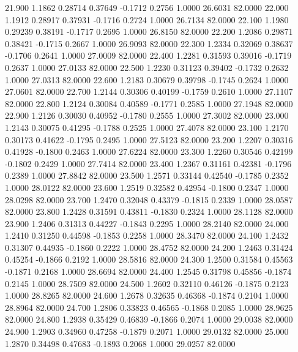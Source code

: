   21.900   1.1862   0.28714   0.37649  -0.1712   0.2756   1.0000  26.6031  82.0000
  22.000   1.1912   0.28917   0.37931  -0.1716   0.2724   1.0000  26.7134  82.0000
  22.100   1.1980   0.29239   0.38191  -0.1717   0.2695   1.0000  26.8150  82.0000
  22.200   1.2086   0.29871   0.38421  -0.1715   0.2667   1.0000  26.9093  82.0000
  22.300   1.2334   0.32069   0.38637  -0.1706   0.2641   1.0000  27.0009  82.0000
  22.400   1.2281   0.31593   0.39016  -0.1719   0.2637   1.0000  27.0133  82.0000
  22.500   1.2230   0.31123   0.39402  -0.1732   0.2632   1.0000  27.0313  82.0000
  22.600   1.2183   0.30679   0.39798  -0.1745   0.2624   1.0000  27.0601  82.0000
  22.700   1.2144   0.30306   0.40199  -0.1759   0.2610   1.0000  27.1107  82.0000
  22.800   1.2124   0.30084   0.40589  -0.1771   0.2585   1.0000  27.1948  82.0000
  22.900   1.2126   0.30030   0.40952  -0.1780   0.2555   1.0000  27.3002  82.0000
  23.000   1.2143   0.30075   0.41295  -0.1788   0.2525   1.0000  27.4078  82.0000
  23.100   1.2170   0.30173   0.41622  -0.1795   0.2495   1.0000  27.5123  82.0000
  23.200   1.2207   0.30316   0.41928  -0.1800   0.2463   1.0000  27.6224  82.0000
  23.300   1.2260   0.30546   0.42199  -0.1802   0.2429   1.0000  27.7414  82.0000
  23.400   1.2367   0.31161   0.42381  -0.1796   0.2389   1.0000  27.8842  82.0000
  23.500   1.2571   0.33144   0.42540  -0.1785   0.2352   1.0000  28.0122  82.0000
  23.600   1.2519   0.32582   0.42954  -0.1800   0.2347   1.0000  28.0298  82.0000
  23.700   1.2470   0.32048   0.43379  -0.1815   0.2339   1.0000  28.0587  82.0000
  23.800   1.2428   0.31591   0.43811  -0.1830   0.2324   1.0000  28.1128  82.0000
  23.900   1.2406   0.31313   0.44227  -0.1843   0.2295   1.0000  28.2140  82.0000
  24.000   1.2410   0.31250   0.44598  -0.1853   0.2258   1.0000  28.3470  82.0000
  24.100   1.2432   0.31307   0.44935  -0.1860   0.2222   1.0000  28.4752  82.0000
  24.200   1.2463   0.31424   0.45254  -0.1866   0.2192   1.0000  28.5816  82.0000
  24.300   1.2500   0.31584   0.45563  -0.1871   0.2168   1.0000  28.6694  82.0000
  24.400   1.2545   0.31798   0.45856  -0.1874   0.2145   1.0000  28.7509  82.0000
  24.500   1.2602   0.32110   0.46126  -0.1875   0.2123   1.0000  28.8265  82.0000
  24.600   1.2678   0.32635   0.46368  -0.1874   0.2104   1.0000  28.8964  82.0000
  24.700   1.2806   0.33823   0.46565  -0.1868   0.2085   1.0000  28.9625  82.0000
  24.800   1.2938   0.35429   0.46839  -0.1866   0.2074   1.0000  29.0038  82.0000
  24.900   1.2903   0.34960   0.47258  -0.1879   0.2071   1.0000  29.0132  82.0000
  25.000   1.2870   0.34498   0.47683  -0.1893   0.2068   1.0000  29.0257  82.0000

